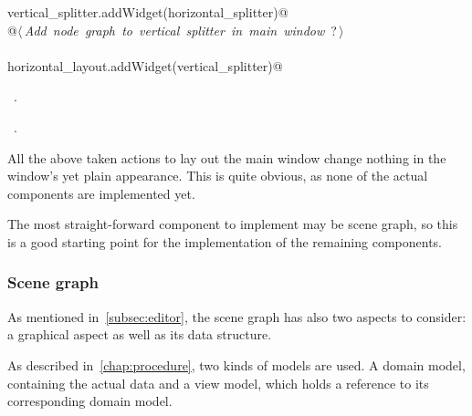\documentclass[
    a4paper,      %
    10pt,         %
    openright,    %
    notitlepage,  %
    parskip=half, %
]{scrreprt}       %
\theoremstyle{definition}                    %
\begin{document}
\begin{flushleft}
\begin{minipage}{\linewidth}
\begin{list}{}{}
\mbox{}\lstinline@    vertical_splitter.addWidget(horizontal_splitter)@\\
\mbox{}\lstinline@    @\hbox{$\langle\,${\itshape Add node graph to vertical splitter in main window}\nobreak\ {\footnotesize ?}$\,\rangle$}\lstinline@@\\
\mbox{}\lstinline@@\\
\mbox{}\lstinline@     horizontal_layout.addWidget(vertical_splitter)@\\
\mbox{}\lstinline@@{\NWsep}
\end{list}
\vspace{-1.5ex}
\footnotesize
\begin{list}{}{\setlength{\itemsep}{-\parsep}\setlength{\itemindent}{-\leftmargin}}
\item \NWtxtMacroDefBy\ .
\item \NWtxtMacroRefIn\ .

\item{}
\end{list}
\end{minipage}\vspace{4ex}
\end{flushleft}
All the above taken actions to lay out the main window change nothing in the
window's yet plain appearance. This is quite obvious, as none of the actual
components are implemented yet.

The most straight-forward component to implement may be scene graph, so this is
a good starting point for the implementation of the remaining components.

\subsubsection{Scene graph}
\label{ssubsec:scene-graph}

As mentioned in~\autoref{subsec:editor}, the scene graph has also two aspects to
consider: a graphical aspect as well as its data structure.


As described in~\autoref{chap:procedure}, two kinds of models are used. A domain
model, containing the actual data and a view model, which holds a reference to
its corresponding domain model.

% 
\end{document}
